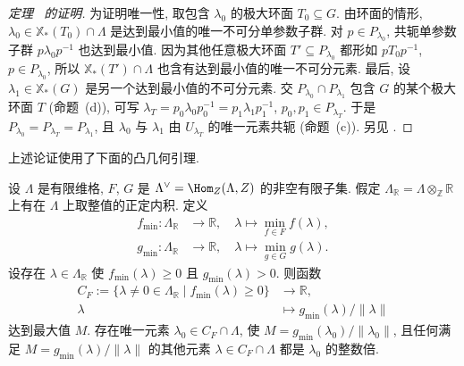 \begin{proof}[定理~ 的证明]
为证明唯一性, 取包含 $\lambda_0$ 的极大环面 $T_0\subseteq G$. 由环面的情形, $\lambda_0\in\mathbb X_*(T_0)\cap\Lambda$ 是达到最小值的唯一不可分单参数子群. 对 $p\in P_{\lambda_0}$, 共轭单参数子群 $p\lambda_0p^{-1}$ 也达到最小值. 因为其他任意极大环面 $T'\subseteq P_{\lambda_0}$ 都形如 $pT_0p^{-1}$, $p\in P_{\lambda_0}$, 所以 $\mathbb X_*(T')\cap\Lambda$ 也含有达到最小值的唯一不可分元素. 最后, 设 $\lambda_1\in\mathbb X_*(G)$ 是另一个达到最小值的不可分元素. 交 $P_{\lambda_0}\cap P_{\lambda_1}$ 包含 $G$ 的某个极大环面 $T$ (命题~(d)), 可写 $\lambda_T=p_0\lambda_0p_0^{-1}=p_1\lambda_1p_1^{-1}$, $p_0,p_1\in P_{\lambda_T}$. 于是 $P_{\lambda_0}=P_{\lambda_T}=P_{\lambda_1}$, 且 $\lambda_0$ 与 $\lambda_1$ 由 $U_{\lambda_T}$ 的唯一元素共轭 (命题~(c)). 另见 \cite[定理 3.4]{Kem78}.
\end{proof}
上述论证使用了下面的凸几何引理.
\begin{lemma}\label{src:8.6.9}
设 $\Lambda$ 是有限维格, $F$, $G$ 是 $\Lambda^\vee=\Hom_{\mathbb Z}(\Lambda,\mathbb Z)$ 的非空有限子集. 假定 $\Lambda_{\mathbb R}=\Lambda\otimes_{\mathbb Z}\mathbb R$ 上有在 $\Lambda$ 上取整值的正定内积. 定义
\begin{align*}
f_{\min}:\Lambda_{\mathbb R}&\longrightarrow\mathbb R,\quad\lambda\longmapsto\min_{f\in F}f(\lambda),\\
g_{\min}:\Lambda_{\mathbb R}&\longrightarrow\mathbb R,\quad\lambda\longmapsto\min_{g\in G}g(\lambda).
\end{align*}
设存在 $\lambda\in\Lambda_{\mathbb R}$ 使 $f_{\min}(\lambda)\geq0$ 且 $g_{\min}(\lambda)>0$. 则函数
\[
\begin{aligned}
C_F:=\{\lambda\ne0\in\Lambda_{\mathbb R}\mid f_{\min}(\lambda)\geq0\}&\longrightarrow\mathbb R,\\
\lambda&\longmapsto g_{\min}(\lambda)/\|\lambda\|
\end{aligned}
\]
达到最大值 $M$. 存在唯一元素 $\lambda_0\in C_F\cap\Lambda$, 使 $M=g_{\min}(\lambda_0)/\|\lambda_0\|$, 且任何满足 $M=g_{\min}(\lambda)/\|\lambda\|$ 的其他元素 $\lambda\in C_F\cap\Lambda$ 都是 $\lambda_0$ 的整数倍.
\end{lemma}

